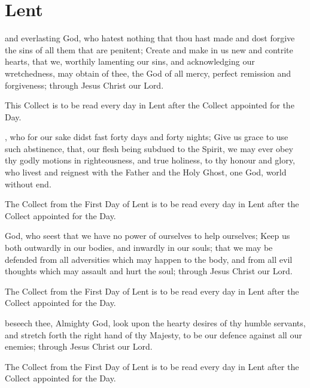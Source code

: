 \section{Lent}

 and everlasting God, who hatest nothing that thou hast made and dost forgive the sins of all them that are penitent; Create and make in us new and contrite hearts, that we, worthily lamenting our sins, and acknowledging our wretchedness, may obtain of thee, the God of all mercy, perfect remission and forgiveness; through Jesus Christ our Lord.
\begin{secrubric}
This Collect is to be read every day in Lent after the Collect appointed for the Day.
\end{secrubric}

, who for our sake didst fast forty days and forty nights; Give us grace to use such abstinence, that, our flesh being subdued to the Spirit, we may ever obey thy godly motions in righteousness, and true holiness, to thy honour and glory, who livest and reignest with the Father and the Holy Ghost, one God, world without end.
\begin{secrubric}
The Collect from the First Day of Lent is to be read every day in Lent after the Collect appointed for the Day.
\end{secrubric}

 God, who seest that we have no power of ourselves to help ourselves; Keep us both outwardly in our bodies, and inwardly in our souls; that we may be defended from all adversities which may happen to the body, and from all evil thoughts which may assault and hurt the soul; through Jesus Christ our Lord.
\begin{secrubric}
The Collect from the First Day of Lent is to be read every day in Lent after the Collect appointed for the Day.
\end{secrubric}

 beseech thee, Almighty God, look upon the hearty desires of thy humble servants, and stretch forth the right hand of thy Majesty, to be our defence against all our enemies; through Jesus Christ our Lord.
\begin{secrubric}
The Collect from the First Day of Lent is to be read every day in Lent after the Collect appointed for the Day.
\end{secrubric}

